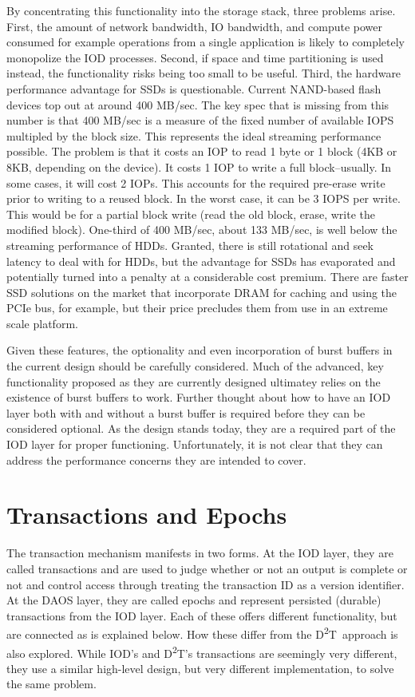 \documentclass[conference]{sig-alt-gov2}
\newcommand{\DDT}{D\textsuperscript{2}T~}
\newcommand{\DDTns}{D\textsuperscript{2}T}
\begin{document}
By concentrating this functionality into the storage stack, three problems
arise.  First, the amount of network bandwidth, IO bandwidth, and compute power
consumed for example operations from a single application is likely to
completely monopolize the IOD processes. Second, if space and time partitioning
is used instead, the functionality risks being too small to be useful. Third,
the hardware performance advantage for SSDs is questionable. Current NAND-based
flash devices top out at around 400 MB/sec. The key spec that is missing from
this number is that 400 MB/sec is a measure of the fixed number of available
IOPS multipled by the block size. This represents the ideal streaming
performance possible. The problem is that it costs an IOP to read 1 byte or 1
block (4KB or 8KB, depending on the device). It costs 1 IOP to write a full
block--usually. In some cases, it will cost 2 IOPs.  This accounts for the
required pre-erase write prior to writing to a reused block. In the worst case,
it can be 3 IOPS per write. This would be for a partial block write (read the
old block, erase, write the modified block). One-third of 400 MB/sec, about 133
MB/sec, is well below the streaming performance of HDDs.  Granted, there is
still rotational and seek latency to deal with for HDDs, but the advantage for
SSDs has evaporated and potentially turned into a penalty at a considerable
cost premium.  There are faster SSD solutions on the market that incorporate
DRAM for caching and using the PCIe bus, for example, but their price precludes
them from use in an extreme scale platform.

Given these features, the optionality and even incorporation of burst buffers
in the current design should be carefully considered. Much of the advanced, key
functionality proposed as they are currently designed ultimatey relies on the
existence of burst buffers to work. Further thought about how to have an IOD
layer both with and without a burst buffer is required before they can be
considered optional. As the design stands today, they are a required part of
the IOD layer for proper functioning. Unfortunately, it is not clear that they
can address the performance concerns they are intended to cover.

\section{Transactions and Epochs}
\label{sec:transactions}

The transaction mechanism manifests in two forms. At the IOD layer, they are
called transactions and are used to judge whether or not an output is complete
or not and control access through treating the transaction ID as a version
identifier. At the DAOS layer, they are called epochs and represent persisted
(durable) transactions from the IOD layer. Each of these offers different
functionality, but are connected as is explained below. How these differ from
the \DDT approach is also explored. While IOD's and \DDTns's transactions are
seemingly very different, they use a similar high-level design, but very
different implementation, to solve the same problem.
\end{document}
